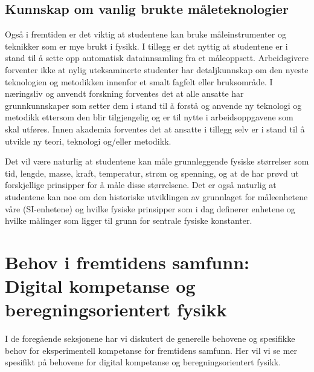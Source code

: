 \documentclass{article}
\begin{document}
\subsection{Kunnskap om vanlig brukte måleteknologier}
Også i fremtiden er det viktig at studentene kan bruke måleinstrumenter og teknikker som er mye brukt i fysikk. I tillegg er det nyttig at studentene er i stand til å sette opp automatisk datainnsamling fra et måleoppsett.
Arbeidsgivere forventer ikke at nylig uteksaminerte studenter har detaljkunnskap om den nyeste teknologien og metodikken innenfor et smalt fagfelt eller bruksområde.
I næringsliv og anvendt forskning forventes det at alle ansatte har grunnkunnskaper som setter dem i stand til å forstå og anvende ny teknologi og metodikk ettersom den blir tilgjengelig og er til nytte i arbeidsoppgavene som skal utføres.
Innen akademia forventes det at ansatte i tillegg selv er i stand til å utvikle ny teori, teknologi og/eller metodikk.

Det vil være naturlig at studentene kan måle grunnleggende fysiske størrelser som tid, lengde, masse, kraft, temperatur, strøm og spenning, og at de har prøvd ut forskjellige prinsipper for å måle disse størrelsene. Det er også naturlig at studentene kan noe om den historiske utviklingen av grunnlaget for måleenhetene våre (SI-enhetene) og hvilke fysiske prinsipper som i dag definerer enhetene og hvilke målinger som ligger til grunn for sentrale fysiske konstanter.


\section{Behov i fremtidens samfunn: Digital kompetanse og beregningsorientert fysikk}
\label{sec:behov-dig}
I de foregående seksjonene har vi diskutert de generelle behovene og spesifikke behov for eksperimentell kompetanse for fremtidens samfunn. Her vil vi se mer spesifikt på behovene for digital kompetanse og beregningsorientert fysikk.

\end{document}
